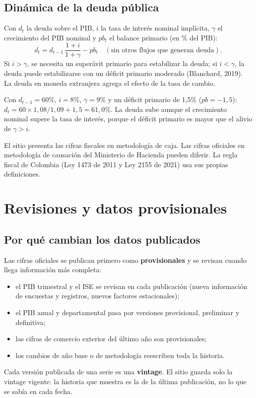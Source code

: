 \section{Dinámica de la deuda pública}
Con $d_t$ la deuda sobre el PIB, $i$ la tasa de interés nominal implícita, $\gamma$ el crecimiento del PIB nominal y
$pb_t$ el balance primario (en \% del PIB):
\[
d_t=d_{t-1}\,\frac{1+i}{1+\gamma}-pb_t\quad(\text{sin otros flujos que generan deuda}).
\]
Si $i>\gamma$, se necesita un superávit primario para estabilizar la deuda; si $i<\gamma$, la deuda puede estabilizarse con
un déficit primario moderado (Blanchard, 2019). La deuda en moneda extranjera agrega el efecto de la tasa de cambio.

\begin{dato}
Con $d_{t-1}=60\%$, $i=8\%$, $\gamma=9\%$ y un déficit primario de 1,5\% ($pb=-1{,}5$):
$d_t=60\times1{,}08/1{,}09+1{,}5=61{,}0\%$. La deuda sube aunque el crecimiento nominal supere la tasa de interés,
porque el déficit primario es mayor que el alivio de $\gamma>i$.
\end{dato}

\begin{alerta}
El sitio presenta las cifras fiscales en metodología de caja. Las cifras oficiales en metodología de causación del
Ministerio de Hacienda pueden diferir. La regla fiscal de Colombia (Ley 1473 de 2011 y Ley 2155 de 2021) usa sus
propias definiciones.
\end{alerta}

\chapter{Revisiones y datos provisionales}
\label{es:f:revisiones}

\section{Por qué cambian los datos publicados}
Las cifras oficiales se publican primero como \textbf{provisionales} y se revisan cuando llega información más
completa:
\begin{itemize}
\item el PIB trimestral y el ISE se revisan en cada publicación (nueva información de encuestas y registros, nuevos
  factores estacionales);
\item el PIB anual y departamental pasa por versiones provisional, preliminar y definitiva;
\item las cifras de comercio exterior del último año son provisionales;
\item los cambios de año base o de metodología reescriben toda la historia.
\end{itemize}
Cada versión publicada de una serie es una \textbf{vintage}. El sitio guarda solo la vintage vigente: la historia que
muestra es la de la última publicación, no lo que se sabía en cada fecha.

